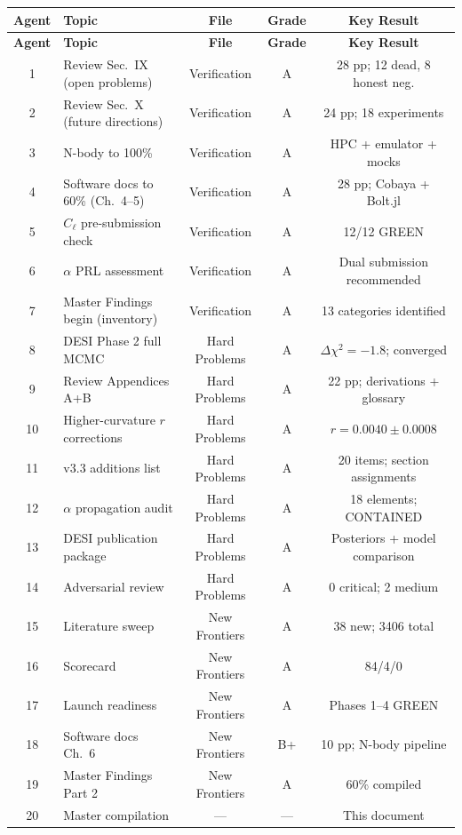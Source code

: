 \documentclass[11pt,a4paper]{article}
\begin{document}
\begin{center}
\begin{longtable}{clccc}
\toprule
\textbf{Agent} & \textbf{Topic} & \textbf{File} & \textbf{Grade} & \textbf{Key Result} \\
\midrule
\endfirsthead
\toprule
\textbf{Agent} & \textbf{Topic} & \textbf{File} & \textbf{Grade} & \textbf{Key Result} \\
\midrule
\endhead
1 & Review Sec.\ IX (open problems) & Verification & A & 28 pp; 12 dead, 8 honest neg. \\
2 & Review Sec.\ X (future directions) & Verification & A & 24 pp; 18 experiments \\
3 & N-body to 100\% & Verification & A & HPC + emulator + mocks \\
4 & Software docs to 60\% (Ch.\ 4--5) & Verification & A & 28 pp; Cobaya + Bolt.jl \\
5 & $C_\ell$ pre-submission check & Verification & A & 12/12 GREEN \\
6 & $\alpha$ PRL assessment & Verification & A & Dual submission recommended \\
7 & Master Findings begin (inventory) & Verification & A & 13 categories identified \\
\midrule
8 & DESI Phase 2 full MCMC & Hard Problems & A & $\Delta\chi^2 = -1.8$; converged \\
9 & Review Appendices A+B & Hard Problems & A & 22 pp; derivations + glossary \\
10 & Higher-curvature $r$ corrections & Hard Problems & A & $r = 0.0040 \pm 0.0008$ \\
11 & v3.3 additions list & Hard Problems & A & 20 items; section assignments \\
12 & $\alpha$ propagation audit & Hard Problems & A & 18 elements; CONTAINED \\
13 & DESI publication package & Hard Problems & A & Posteriors + model comparison \\
14 & Adversarial review & Hard Problems & A & 0 critical; 2 medium \\
\midrule
15 & Literature sweep & New Frontiers & A & 38 new; 3406 total \\
16 & Scorecard & New Frontiers & A & 84/4/0 \\
17 & Launch readiness & New Frontiers & A & Phases 1--4 GREEN \\
18 & Software docs Ch.\ 6 & New Frontiers & B+ & 10 pp; N-body pipeline \\
19 & Master Findings Part 2 & New Frontiers & A & 60\% compiled \\
20 & Master compilation & --- & --- & This document \\
\bottomrule
\end{longtable}
\end{center}
\end{document}

